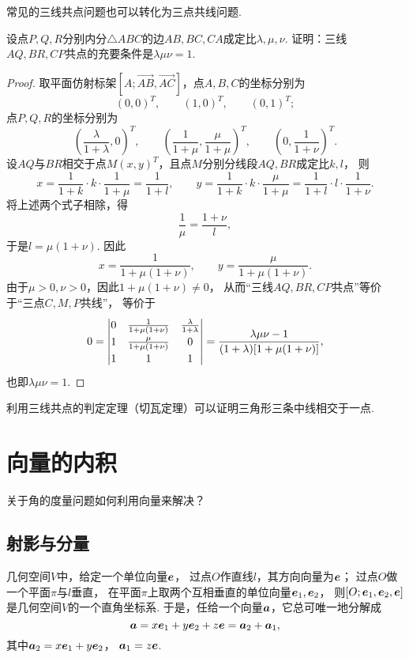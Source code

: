 常见的三线共点问题也可以转化为三点共线问题.

\begin{example}[切瓦定理]
设点\(P,Q,R\)分别内分\(\triangle ABC\)的边\(AB,BC,CA\)成定比\(\lambda,\mu,\nu\).
证明：三线\(AQ,BR,CP\)共点的充要条件是\(\lambda \mu \nu = 1\).
\begin{proof}
取平面仿射标架\([A;\vec{AB},\vec{AC}]\)，点\(A,B,C\)的坐标分别为\[
	(0,0)^T, \qquad
	(1,0)^T, \qquad
	(0,1)^T;
\]
点\(P,Q,R\)的坐标分别为\[
	\left(\frac{\lambda}{1+\lambda},0\right)^T, \qquad
	\left(\frac{1}{1+\mu},\frac{\mu}{1+\mu}\right)^T, \qquad
	\left(0,\frac{1}{1+\nu}\right)^T.
\]
设\(AQ\)与\(BR\)相交于点\(M(x,y)^T\)，且点\(M\)分别分线段\(AQ,BR\)成定比\(k,l\)，
则\[
x = \frac{1}{1+k} \cdot k \cdot \frac{1}{1+\mu}
= \frac{1}{1+l}, \qquad
y = \frac{1}{1+k} \cdot k \cdot \frac{\mu}{1+\mu}
= \frac{1}{1+l} \cdot l \cdot \frac{1}{1+\nu}.
\]
将上述两个式子相除，得\[
\frac{1}{\mu}
= \frac{1+\nu}{l},
\]于是\(l = \mu(1+\nu)\).
因此\[
	x = \frac{1}{1+\mu(1+\nu)}, \qquad
	y = \frac{\mu}{1+\mu(1+\nu)}.
\]
由于\(\mu>0,\nu>0\)，因此\(1+\mu(1+\nu)\neq0\)，
从而“三线\(AQ,BR,CP\)共点”等价于“三点\(C,M,P\)共线”，
等价于\[
	0 = \def\arraystretch{1.2} \begin{vmatrix}
		0 & \frac{1}{1+\mu(1+\nu)} & \frac{\lambda}{1+\lambda} \\
		1 & \frac{\mu}{1+\mu(1+\nu)} & 0 \\
		1 & 1 & 1
	\end{vmatrix}
	= \frac{\lambda \mu \nu - 1}{(1+\lambda) [1+\mu(1+\nu)]},
\]
也即\(\lambda \mu \nu = 1\).
\end{proof}
\end{example}

利用三线共点的判定定理（切瓦定理）可以证明三角形三条中线相交于一点.

\section{向量的内积}
关于角的度量问题如何利用向量来解决？

\subsection{射影与分量}
几何空间\(V\)中，给定一个单位向量\(\boldsymbol{e}\)，
过点\(O\)作直线\(l\)，其方向向量为\(\boldsymbol{e}\)；
过点\(O\)做一个平面\(\pi\)与\(l\)垂直，
在平面\(\pi\)上取两个互相垂直的单位向量\(\boldsymbol{e}_1,\boldsymbol{e}_2\)，
则\([O;\boldsymbol{e}_1,\boldsymbol{e}_2,\boldsymbol{e}]\)是几何空间\(V\)的一个直角坐标系.
于是，任给一个向量\(\boldsymbol{a}\)，它总可唯一地分解成\[
	\boldsymbol{a}
	= x \boldsymbol{e}_1 + y \boldsymbol{e}_2 + z \boldsymbol{e}
	= \boldsymbol{a}_2 + \boldsymbol{a}_1,
\]
其中\(\boldsymbol{a}_2 = x \boldsymbol{e}_1 + y \boldsymbol{e}_2\)，
\(\boldsymbol{a}_1 = z \boldsymbol{e}\).

